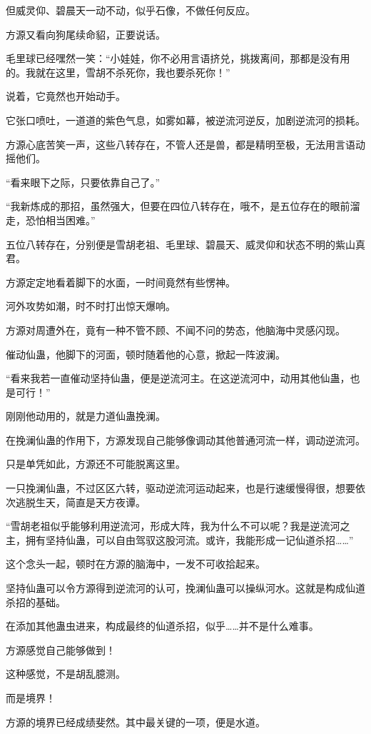 \begin{this_body}
但威灵仰、碧晨天一动不动，似乎石像，不做任何反应。

方源又看向狗尾续命貂，正要说话。

毛里球已经嘿然一笑：“小娃娃，你不必用言语挤兑，挑拨离间，那都是没有用的。我就在这里，雪胡不杀死你，我也要杀死你！”

说着，它竟然也开始动手。

它张口喷吐，一道道的紫色气息，如雾如幕，被逆流河逆反，加剧逆流河的损耗。

方源心底苦笑一声，这些八转存在，不管人还是兽，都是精明至极，无法用言语动摇他们。

“看来眼下之际，只要依靠自己了。”

“我新炼成的那招，虽然强大，但要在四位八转存在，哦不，是五位存在的眼前溜走，恐怕相当困难。”

五位八转存在，分别便是雪胡老祖、毛里球、碧晨天、威灵仰和状态不明的紫山真君。

方源定定地看着脚下的水面，一时间竟然有些愣神。

河外攻势如潮，时不时打出惊天爆响。

方源对周遭外在，竟有一种不管不顾、不闻不问的势态，他脑海中灵感闪现。

催动仙蛊，他脚下的河面，顿时随着他的心意，掀起一阵波澜。

“看来我若一直催动坚持仙蛊，便是逆流河主。在这逆流河中，动用其他仙蛊，也是可行！”

刚刚他动用的，就是力道仙蛊挽澜。

在挽澜仙蛊的作用下，方源发现自己能够像调动其他普通河流一样，调动逆流河。

只是单凭如此，方源还不可能脱离这里。

一只挽澜仙蛊，不过区区六转，驱动逆流河运动起来，也是行速缓慢得很，想要依次逃脱生天，简直是天方夜谭。

“雪胡老祖似乎能够利用逆流河，形成大阵，我为什么不可以呢？我是逆流河之主，拥有坚持仙蛊，可以自由驾驭这股河流。或许，我能形成一记仙道杀招……”

这个念头一起，顿时在方源的脑海中，一发不可收拾起来。

坚持仙蛊可以令方源得到逆流河的认可，挽澜仙蛊可以操纵河水。这就是构成仙道杀招的基础。

在添加其他蛊虫进来，构成最终的仙道杀招，似乎……并不是什么难事。

方源感觉自己能够做到！

这种感觉，不是胡乱臆测。

而是境界！

方源的境界已经成绩斐然。其中最关键的一项，便是水道。


\end{this_body}
